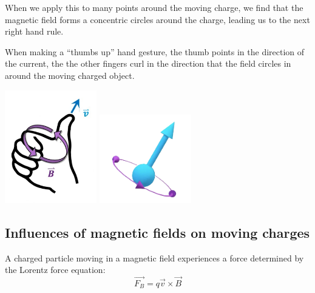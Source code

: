 \documentclass[12pt, titlepage]{article}
\begin{document}
When we apply this to many points around the moving charge, we find that the magnetic field forms a concentric circles around the charge, leading us to the next right hand rule.

When making a ``thumbs up'' hand gesture, the thumb points in the direction of the current, the the other fingers curl in the direction that the field circles in around the moving charged object.
\begin{center}
    \includegraphics[width=4cm]{media/rh2_2.png}
    \includegraphics[width=4cm]{media/rh2.png}
\end{center}

\subsection*{Influences of magnetic fields on moving charges}

A charged particle moving in a magnetic field experiences a force determined by the Lorentz force equation:
\begin{equation*}
    \vec{F_B} = q\vec{v}\times\vec{B}
\end{equation*}
\end{document}
